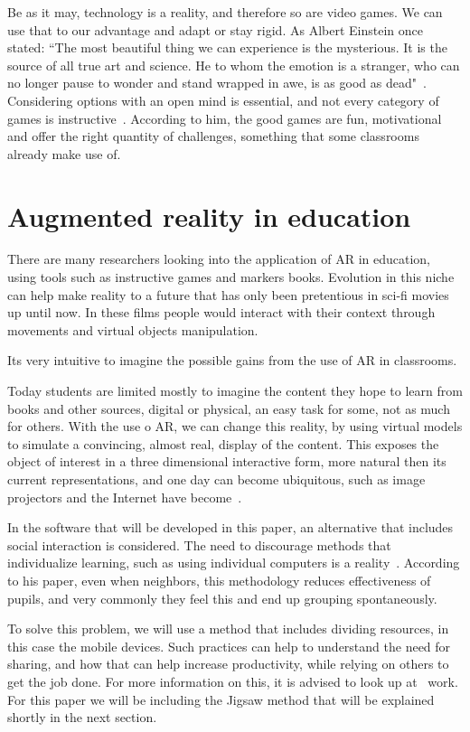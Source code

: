 \documentclass[a4paper,twoside]{article}
\begin{document}
Be as it may, technology is a reality, and therefore so are video games. We can use that to our advantage and adapt or stay rigid. As Albert Einstein once stated: ``The most beautiful thing we can experience is the mysterious. It is the source of all true art and science. He to whom the emotion is a stranger, who can no longer pause to wonder and stand wrapped in awe, is as good as dead"~\cite{calaprice2000expanded}. Considering options with an open mind is essential, and not every category of games is instructive~\cite{hogle1996considering}. According to him, the good games are fun, motivational and offer the right quantity of challenges, something that some classrooms already make use of.

\section{Augmented reality in education}
\noindent There are many researchers looking into the application of AR in education, using tools such as instructive games and markers books. Evolution in this niche can help make reality to a future that has only been pretentious in sci-fi movies up until now. In these films people would interact with their context through movements and virtual objects manipulation. 

Its very intuitive to imagine the possible gains from the use of AR in classrooms. 

Today students are limited mostly to imagine the content they hope to learn from books and other sources, digital or physical, an easy task for some, not as much for others. With the use o AR, we can change this reality, by using virtual models to simulate a convincing, almost real, display of the content. This exposes the object of interest in a three dimensional interactive form, more natural then its current representations, and one day can become ubiquitous, such as image projectors and the Internet have become~\cite{cardoso2014uso}.

In the software that will be developed in this paper, an alternative that includes social interaction is considered. The need to discourage methods that individualize learning, such as using individual computers is a reality~\cite{billinghurst2002augmented}. According to his paper, even when neighbors, this methodology reduces effectiveness of pupils, and very commonly they feel this and end up grouping spontaneously.

To solve this problem, we will use a method that includes dividing resources, in this case the mobile devices. Such practices can help to understand the need for sharing, and how that can help increase productivity, while relying on others to get the job done. For more information on this, it is advised to look up at~\cite{svanaes2000search} work. For this paper we will be including the Jigsaw method that will be explained shortly in the next section.
\end{document}
